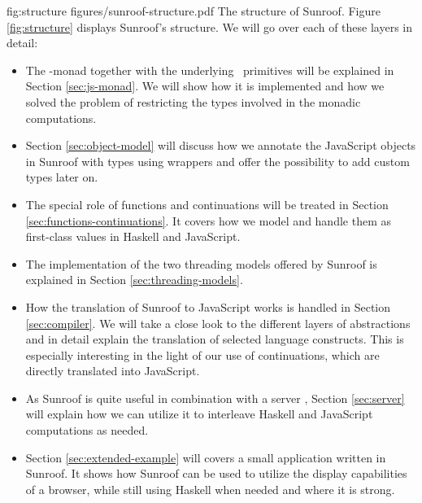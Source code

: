 \Figure%
{fig:structure}%
{figures/sunroof-structure.pdf}%
{The structure of Sunroof.}
Figure \ref{fig:structure} displays Sunroof's structure. 
We will go over each of these layers in detail:
\begin{itemize}
\item
The \JS-monad together with the underlying \JSI~primitives 
will be explained in Section \ref{sec:js-monad}. 
We will show how it is implemented and how we solved
the problem of restricting the types involved in the monadic 
computations.
\item
Section \ref{sec:object-model} will discuss how we annotate 
the JavaScript objects in Sunroof with types using wrappers 
and offer the possibility 
to add custom types later on.
\item
The special role of functions and continuations will
be treated in Section \ref{sec:functions-continuations}. 
It covers how we model and handle
them as first-class values in Haskell and JavaScript.
\item
The implementation of the two threading models offered by Sunroof is explained 
in Section \ref{sec:threading-models}.
\item
How the translation of Sunroof to JavaScript works is handled in 
Section \ref{sec:compiler}. We will take a close look to the
different layers of abstractions and in detail explain the 
translation of selected language constructs. This is 
especially interesting in the light of our use of continuations, which
are directly translated into JavaScript.
\item
As Sunroof is quite useful in combination with a server \cite{Farmer:12:WebDSLs},
Section \ref{sec:server} will explain how we can utilize it 
to interleave Haskell and JavaScript computations as needed.
\item
Section \ref{sec:extended-example} will covers a small application 
written in Sunroof. It shows how Sunroof can be used to utilize the 
display capabilities of a browser, while still using Haskell when needed
and where it is strong.
\end{itemize}


